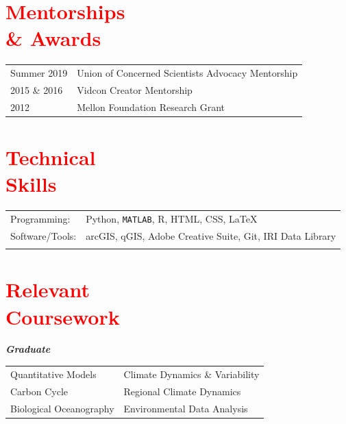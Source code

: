 \documentclass[margin, line]{res}
\begin{document}
\begin{resume}
\section{\sc \textcolor{Red}{\large{Mentorships \\ \& Awards}}}
\vspace*{0.1in}
\begin{tabular}{@{}p{1in}p{4in}}
Summer 2019 & Union of Concerned Scientists Advocacy Mentorship\\
2015 \& 2016 &  Vidcon Creator Mentorship\\
2012 & Mellon Foundation Research Grant\\
\end{tabular}


\section{\sc \textcolor{Red}{\large{Technical \\ Skills}}}
\vspace*{0.05in}
\begin{tabular}{@{}p{1in}p{4in}}

Programming:& Python, \texttt{MATLAB}, R, HTML, CSS, \LaTeX \\
Software/Tools:&  arcGIS, qGIS, Adobe Creative Suite, Git, IRI Data Library \\\\

\end{tabular}



\section{\sc \textcolor{Red}{\large{Relevant \\ Coursework}}}

\textit{\textbf{Graduate}}
\vspace*{0.05in}\\
\begin{tabular}{@{}p{2.5in}p{4in}}
Quantitative Models & Climate Dynamics \& Variability \\
Carbon Cycle & Regional Climate Dynamics\\
Biological Oceanography & Environmental Data Analysis \\
\end{tabular}


\end{resume}
\end{document}
